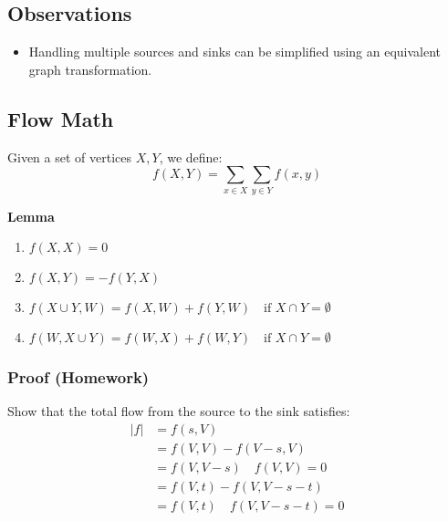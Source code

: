 \subsection{Observations}
\begin{definition}
    \begin{itemize}
        \item Handling multiple sources and sinks can be simplified using an equivalent graph transformation.
    \end{itemize}
\end{definition}

\subsection{Flow Math}
\begin{definition}
    Given a set of vertices $X, Y$, we define:
    \[
    f(X, Y) = \sum_{x \in X} \sum_{y \in Y} f(x, y)
    \]

    \textbf{Lemma}
    \begin{enumerate}
        \item $f(X, X) = 0$
        \item $f(X, Y) = -f(Y, X)$
        \item $f(X \cup Y, W) = f(X, W) + f(Y, W) \quad \text{if } X \cap Y = \emptyset$
        \item $f(W, X \cup Y) = f(W, X) + f(W, Y) \quad \text{if } X \cap Y = \emptyset$ 
    \end{enumerate}
\end{definition}

\subsubsection{Proof (Homework)}
\begin{derivation}
    Show that the total flow from the source to the sink satisfies:
    \begin{align*}
    |f| &= f(s, V) \\
        &= f(V,V) - f(V - s, V) \\
        &= f(V, V - s) \quad f(V,V) = 0\\
        &= f(V, t) - f(V,V - s - t) \\
        &= f(V, t) \quad f(V, V - s - t) = 0
    \end{align*}
\end{derivation}

